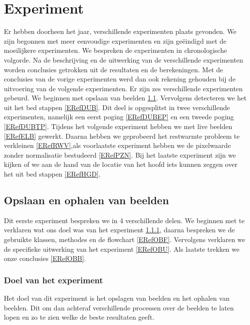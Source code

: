 \chapter{Experiment}
\label{ERef}
Er hebben doorheen het jaar, verschillende experimenten plaats gevonden. We zijn begonnen met meer eenvoudige experimenten en zijn ge\"eindigd met de moeilijkere experimenten. We bespreken de experimenten in chronologische volgorde. Na de beschrijving en de uitwerking van de verschillende experimenten worden conclusies getrokken uit de resultaten en de berekeningen. Met de conclusies van de vorige experimenten werd dan ook rekening gehouden bij de uitvoering van de volgende experimenten. Er zijn zes verschillende experimenten gebeurd. We beginnen met opslaan van beelden \ref{ERefOvB}. Vervolgens detecteren we het uit het bed stappen \ref{ERefDUB}. Dit deel is opgesplitst in twee verschillende experimenten, namelijk een eerst poging \ref{ERefDUBEP} en een tweede poging \ref{ERefDUBTP}. Tijdens het volgende experiment hebben we met live beelden \ref{ERefELB} gewerkt. Daarna hebben we geprobeerd het restwarmte probleem te verkleinen \ref{ERefRWV},als voorlaatste experiment hebben we de pixelwaarde zonder normalisatie bestudeerd \ref{ERefPZN}. Bij het laatste experiment zijn we kijken of we aan de hand van de locatie van het hoofd iets kunnen zeggen over het uit bed stappen \ref{ERefHGD}.

\section{Opslaan en ophalen van beelden}
\label{ERefOvB}
Dit eerste experiment bespreken we in 4 verschillende delen. We beginnen met te verklaren wat ons doel was van het experiment \ref{ERefOBD}, daarna bespreken we de gebruikte klassen, methodes en de flowchart \ref{ERefOBF}. Vervolgens verklaren we de specifieke uitwerking van het experiment \ref{ERefOBU}. Als laatste trekken we onze conclusies \ref{ERefOBB}.

\subsection{Doel van het experiment}
\label{ERefOBD}
Het doel van dit experiment is het opslagen van beelden en het ophalen van beelden. Dit om dan achteraf verschillende processen over de beelden te laten lopen en zo te zien welke de beste resultaten geeft. 

